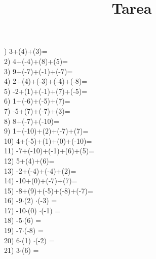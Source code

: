 \documentclass[a4paper,10pt]{article}
\title{Tarea}
\author{}
\date{}
\begin{document}
)   3+(4)+(3)=
\vspace{0.5cm}\\2)   4+(-4)+(8)+(5)=
\vspace{0.5cm}\\3)   9+(-7)+(-1)+(-7)=
\vspace{0.5cm}\\4)   2+(4)+(-3)+(-4)+(-8)=
\vspace{0.5cm}\\5)   -2+(1)+(-1)+(7)+(-5)=
\vspace{0.5cm}\\6)   1+(-6)+(-5)+(7)=
\vspace{0.5cm}\\7)   -5+(7)+(-7)+(3)=
\vspace{0.5cm}\\8)   8+(-7)+(-10)=
\vspace{0.5cm}\\9)   1+(-10)+(2)+(-7)+(7)=
\vspace{0.5cm}\\10)   4+(-5)+(1)+(0)+(-10)=
\vspace{0.5cm}\\11)   -7+(-10)+(-1)+(6)+(5)=
\vspace{0.5cm}\\12)   5+(4)+(6)=
\vspace{0.5cm}\\13)   -2+(-4)+(-4)+(2)=
\vspace{0.5cm}\\14)   -10+(0)+(-7)+(7)=
\vspace{0.5cm}\\15)   -8+(9)+(-5)+(-8)+(-7)=
\vspace{0.5cm}\\16)   -9$\cdot$(2) $\cdot$(-3) =
\vspace{0.5cm}\\17)   -10$\cdot$(0) $\cdot$(-1) =
\vspace{0.5cm}\\18)   -5$\cdot$(6) =
\vspace{0.5cm}\\19)   -7$\cdot$(-8) =
\vspace{0.5cm}\\20)   6$\cdot$(1) $\cdot$(-2) =
\vspace{0.5cm}\\21)   3$\cdot$(6) =
\end{document}
